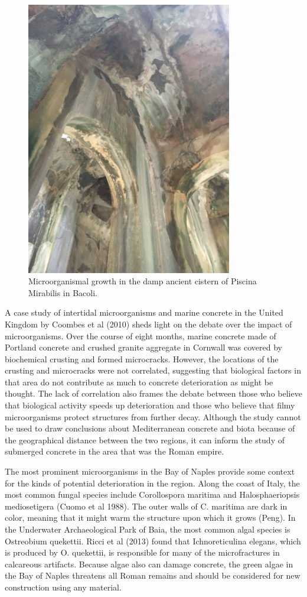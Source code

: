 \documentclass[12pt]{article}
\begin{document}
\begin{figure}[ht]
  \includegraphics[width=\textwidth,height=12cm]{piscina_mirabilis.jpg}
  \caption{Microorganismal growth in the damp ancient cistern of Piscina Mirabilis in Bacoli.}
\end{figure}

A case study of intertidal microorganisms and marine concrete in the United Kingdom by Coombes et al (2010) sheds light on the debate over the impact of microorganisms.  Over the course of eight months, marine concrete made of Portland concrete and crushed granite aggregate in Cornwall was covered by biochemical crusting and formed microcracks.  However, the locations of the crusting and microcracks were not correlated, suggesting that biological factors in that area do not contribute as much to concrete deterioration as might be thought.  The lack of correlation also frames the debate between those who believe that biological activity speeds up deterioration and those who believe that filmy microorganisms protect structures from further decay.  Although the study cannot be used to draw conclusions about Mediterranean concrete and biota because of the geographical distance between the two regions, it can inform the study of submerged concrete in the area that was the Roman empire.

	The most prominent microorganisms in the Bay of Naples provide some context for the kinds of potential deterioration in the region.  Along the coast of Italy, the most common fungal species include Corollospora maritima and Halosphaeriopsis mediosetigera (Cuomo et al 1988).  The outer walls of C. maritima are dark in color, meaning that it might warm the structure upon which it grows (Peng).  In the Underwater Archaeological Park of Baia, the most common algal species is Ostreobium quekettii.  Ricci et al (2013) found that Ichnoreticulina elegans, which is produced by O. quekettii, is responsible for many of the microfractures in calcareous artifacts.  Because algae also can damage concrete, the green algae in the Bay of Naples threatens all Roman remains and should be considered for new construction using any material.  
    
\end{document}
